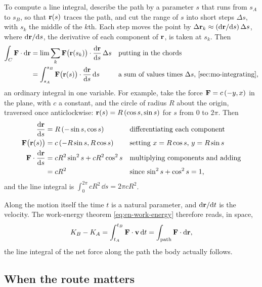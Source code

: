 \begin{toolbox}
To compute a line integral, describe the path by a parameter $s$ that
runs from $s_A$ to $s_B$, so that $\bm{\mathrm{r}}(s)$ traces the path, and cut
the range of $s$ into short steps $\Delta s$, with $s_k$ the middle of the
$k$th. Each step moves the point by $\Delta\bm{\mathrm{r}}_k \approx (\mathrm{d}\bm{\mathrm{r}}/\mathrm{d}
s)\,\Delta s$, where $\mathrm{d}\bm{\mathrm{r}}/\mathrm{d} s$, the derivative of each component
of $\bm{\mathrm{r}}$, is taken at $s_k$. Then
\begin{align*}
   \int_C \vb{F}\cdot\dd\vb{r}
   &= \lim\sum_k\vb{F}\bigl(\vb{r}(s_k)\bigr)\cdot
      \frac{\dd\vb{r}}{\dd s}\,\Delta s
      && \text{putting in the chords}\\
   &= \int_{s_A}^{s_B}\vb{F}\bigl(\vb{r}(s)\bigr)\cdot
      \frac{\dd\vb{r}}{\dd s}\,\dd s
      && \text{a sum of values times $\Delta s$, \cref{sec:mo-integrating},}
\end{align*}
an ordinary integral in one variable.
For example, take the force $\bm{\mathrm{F}} = c\,(-y, x)$ in the plane, with $c$
a constant, and the circle of radius $R$ about the origin, traversed once
anticlockwise: $\bm{\mathrm{r}}(s) = R\,(\cos s, \sin s)$ for $s$ from 0 to $2\pi$.
Then
\begin{align*}
   \frac{\mathrm{d}\bm{\mathrm{r}}}{\mathrm{d} s} &= R\,(-\sin s, \cos s)
      && \text{differentiating each component}\\
   \bm{\mathrm{F}}\bigl(\bm{\mathrm{r}}(s)\bigr) &= c\,(-R\sin s, R\cos s)
      && \text{setting $x = R\cos s$, $y = R\sin s$}\\
   \bm{\mathrm{F}}\cdot\frac{\mathrm{d}\bm{\mathrm{r}}}{\mathrm{d} s}
   &= cR^2\sin^2 s + cR^2\cos^2 s
      && \text{multiplying components and adding}\\
   &= cR^2
      && \text{since $\sin^2 s + \cos^2 s = 1$,}
\end{align*}
and the line integral is $\int_0^{2\pi} cR^2\,\dd s = 2\pi cR^2$.
\end{toolbox}

Along the motion itself the time $t$ is a natural parameter, and
$\mathrm{d}\bm{\mathrm{r}}/\mathrm{d} t$ is the velocity. The work-energy theorem
\cref{eq:en-work-energy} therefore reads, in space,
\begin{equation*}
   K_B - K_A = \int_{t_A}^{t_B}\bm{\mathrm{F}}\cdot\bm{\mathrm{v}}\,\mathrm{d} t
   = \int_{\text{path}}\bm{\mathrm{F}}\cdot\mathrm{d}\bm{\mathrm{r}} ,
\end{equation*}
the line integral of the net force along the path the body actually
follows.

\subsection*{When the route matters}

